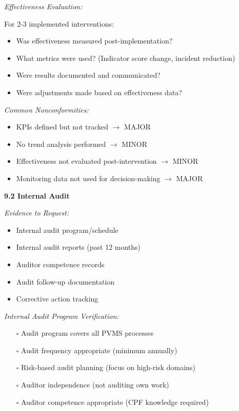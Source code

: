 \documentclass[11pt,a4paper]{article}
\begin{document}
\textit{Effectiveness Evaluation:}

For 2-3 implemented interventions:
\begin{itemize}
\item Was effectiveness measured post-implementation?
\item What metrics were used? (Indicator score change, incident reduction)
\item Were results documented and communicated?
\item Were adjustments made based on effectiveness data?
\end{itemize}

\textit{Common Nonconformities:}
\begin{itemize}
\item KPIs defined but not tracked $\rightarrow$ MAJOR
\item No trend analysis performed $\rightarrow$ MINOR
\item Effectiveness not evaluated post-intervention $\rightarrow$ MINOR
\item Monitoring data not used for decision-making $\rightarrow$ MAJOR
\end{itemize}

\textbf{9.2 Internal Audit}

\textit{Evidence to Request:}
\begin{itemize}
\item Internal audit program/schedule
\item Internal audit reports (past 12 months)
\item Auditor competence records
\item Audit follow-up documentation
\item Corrective action tracking
\end{itemize}

\textit{Internal Audit Program Verification:}

\begin{itemize}
\item[$\square$] Audit program covers all PVMS processes
\item[$\square$] Audit frequency appropriate (minimum annually)
\item[$\square$] Risk-based audit planning (focus on high-risk domains)
\item[$\square$] Auditor independence (not auditing own work)
\item[$\square$] Auditor competence appropriate (CPF knowledge required)
\end{itemize}
\end{document}
